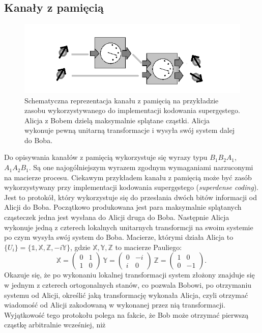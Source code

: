 \documentclass[10pt]{article} %
\newcommand{\X}{\mathbb{X}}
\newcommand{\Y}{\mathbb{Y}}
\newcommand{\Z}{\mathbb{Z}}
\newcommand{\I}{\mathbb{1}}
\begin{document}
\subsection{Kanały z pamięcią}
\begin{figure}[h]
\centering
\includegraphics{obrazki/memory_new}
\caption{Schematyczna reprezentacja kanału z pamięcią na przykładzie zasobu wykorzystywanego do implementacji kodowania supergęstego. Alicja z Bobem dzielą maksymalnie splątane cząstki. Alicja wykonuje pewną unitarną transformacje i wysyła swój system dalej do Boba.}
\end{figure}
Do opisywania kanałów z pamięcią wykorzystuje się wyrazy typu $B_1B_2A_1$, $A_1A_2B_1$. Są one najogólniejszym wyrazem zgodnym wymaganiami narzuconymi na macierze procesu.
Ciekawym przykładem kanału z pamięcią może być zasób wykorzystywany przy implementacji kodowania supergęstego (\textit{superdense coding}). Jest to protokół, który wykorzystuje się do przesłania dwóch bitów informacji od Alicji do Boba. Początkowo produkowana jest para maksymalnie splątanych cząsteczek jedna jest wysłana do Alicji druga do Boba. Następnie Alicja wykonuje jedną z czterech lokalnych unitarnych transformcji na swoim systemie po czym wysyła swój system do Boba. Macierze, którymi działa Alicja to 
$\{ U_i\}=\{ \I, \X, \Z, -i\Y \}$, gdzie $\X, \Y, \Z$ to macierze Pauliego:
\begin{equation}
\X = \begin{pmatrix}
0 &1\\
1 &0
\end{pmatrix}~
\Y = \begin{pmatrix}
0 &-i\\
i &0
\end{pmatrix}~
\Z = \begin{pmatrix}
1 &0\\
0 &-1
\end{pmatrix}.~
\end{equation} Okazuje się, że po wykonaniu lokalnej transformacji system złożony znajduje się w jednym z czterech ortogonalnych stanów, co pozwala Bobowi, po otrzymaniu systemu od Alicji, określić jaką transformację wykonała Alicja, czyli otrzymać wiadomość od Alicji zakodowaną w wykonanej przez nią transformacji. Wyjątkowość tego protokołu polega na fakcie, że Bob może otrzymać pierwszą cząstkę arbitralnie wcześniej, niż
\end{document}
